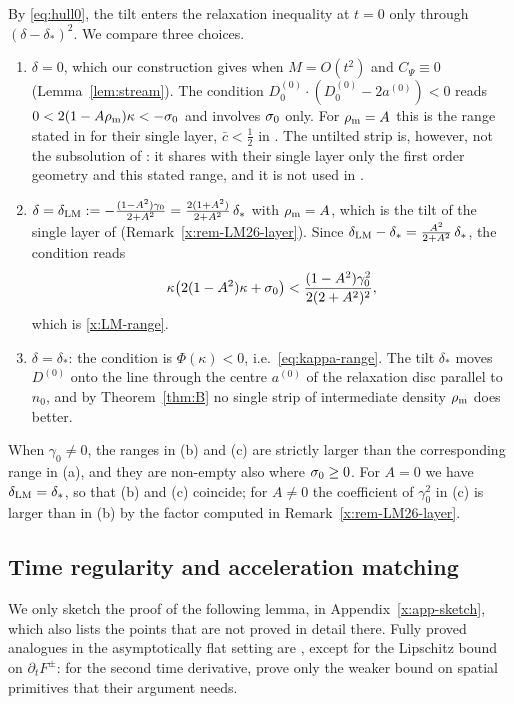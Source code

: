 \begin{remark}\label{x:rem-normalisations}
By \eqref{eq:hull0}, the tilt enters the relaxation inequality at $t=0$ only through $(\delta-\delta_*)^2$. We compare three choices.
\begin{enumerate}[label=\textup{(\alph*)},leftmargin=*]
\item $\delta=0$, which our construction gives when $M=O(t^2)$ and $C_\Psi\equiv0$ (Lemma~\ref{lem:stream}). The condition $D^{(0)}_0\cdot(D^{(0)}_0-2a^{(0)})<0$ reads
$0<2(1-A\rho_{\mathrm m})\kappa<-\sigma_0$ and involves $\sigma_0$ only. For $\rho_{\mathrm m}=A$ this is the range stated in \cite{LM26} for their single layer, $\bar c<\frac12$ in \cite[(7.13)]{LM26}. The untilted strip
is, however, not the subsolution of \cite{LM26}: it shares with their single layer only the first order geometry and this stated range, and it is not used in \cite{LM26}.
\item $\delta=\delta_{\rm LM}:=-\frac{(1-A^2)\gamma_0}{2+A^2}=\frac{2(1+A^2)}{2+A^2}\,\delta_*$ with $\rho_{\mathrm m}=A$, which is the tilt of the single layer of \cite{LM26}
(Remark~\ref{x:rem-LM26-layer}). Since $\delta_{\rm LM}-\delta_*=\frac{A^2}{2+A^2}\,\delta_*$, the condition reads
\[
\kappa\big(2(1-A^2)\kappa+\sigma_0\big)<\frac{(1-A^2)\gamma_0^2}{2(2+A^2)^2},
\]
which is \eqref{x:LM-range}.
\item $\delta=\delta_*$: the condition is $\Phi(\kappa)<0$, i.e.\ \eqref{eq:kappa-range}. The tilt $\delta_*$ moves $D^{(0)}$ onto the line through the centre $a^{(0)}$ of the relaxation disc
parallel to $n_0$, and by Theorem~\ref{thm:B} no single strip of intermediate density $\rho_{\mathrm m}$ does better.
\end{enumerate}
When $\gamma_0\ne0$, the ranges in (b) and (c) are strictly larger than the corresponding range in (a), and they are non-empty also where $\sigma_0\ge0$. For $A=0$ we have
$\delta_{\rm LM}=\delta_*$, so that (b) and (c) coincide; for $A\ne0$ the coefficient of $\gamma_0^2$ in (c) is larger than in (b) by the factor computed in Remark~\ref{x:rem-LM26-layer}.
\end{remark}

\subsection{Time regularity and acceleration matching}
We only sketch the proof of the following lemma, in Appendix~\ref{x:app-sketch}, which also lists the points that are not proved in detail there. Fully proved analogues in the asymptotically
flat setting are \cite[Lemmas~8.4--8.5 and Prop.~7.1]{LM26}, except for the Lipschitz bound on $\partial_tF^\pm$: for the second time derivative, \cite[Lemma~8.6 and Prop.~7.2]{LM26}
prove only the weaker bound on spatial primitives that their argument needs.

